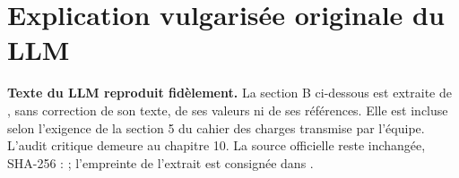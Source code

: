 \section{Explication vulgarisée originale du LLM}
\label{app:E}

\textbf{Texte du LLM reproduit fidèlement.} La section B ci-dessous est extraite de , sans correction de son texte, de ses valeurs ni de ses références. Elle est incluse selon l’exigence de la section 5 du cahier des charges transmise par l’équipe. L’audit critique demeure au chapitre 10. La source officielle reste inchangée, SHA-256 :  ; l’empreinte de l’extrait est consignée dans .

